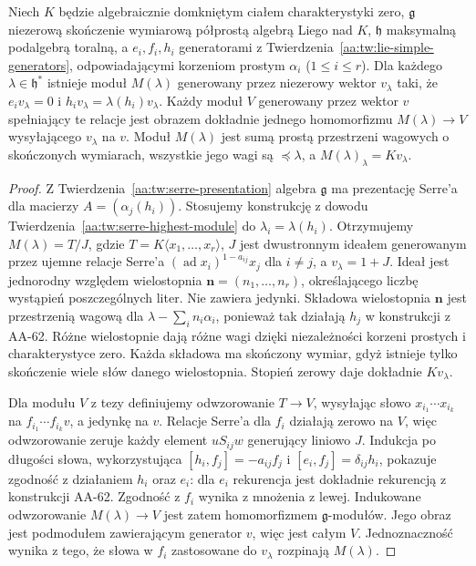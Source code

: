 \begin{twierdzenie}
\label{aa:tw:verma-universal}
Niech $K$ będzie algebraicznie domkniętym ciałem charakterystyki zero, $\mathfrak g$ niezerową skończenie wymiarową półprostą algebrą Liego nad $K$, $\mathfrak h$ maksymalną podalgebrą toralną, a $e_i,f_i,h_i$ generatorami z Twierdzenia~\ref{aa:tw:lie-simple-generators}, odpowiadającymi korzeniom prostym $\alpha_i$ ($1\le i\le r$). Dla każdego $\lambda\in\mathfrak h^*$ istnieje moduł $M(\lambda)$ generowany przez niezerowy wektor $v_\lambda$ taki, że $e_i v_\lambda=0$ i $h_i v_\lambda=\lambda(h_i)v_\lambda$. Każdy moduł $V$ generowany przez wektor $v$ spełniający te relacje jest obrazem dokładnie jednego homomorfizmu $M(\lambda)\to V$ wysyłającego $v_\lambda$ na $v$. Moduł $M(\lambda)$ jest sumą prostą przestrzeni wagowych o skończonych wymiarach, wszystkie jego wagi są $\preceq\lambda$, a $M(\lambda)_\lambda=Kv_\lambda$.
\end{twierdzenie}
\begin{proof}
Z Twierdzenia~\ref{aa:tw:serre-presentation} algebra $\mathfrak g$ ma prezentację Serre'a dla macierzy $A=(\alpha_j(h_i))$. Stosujemy konstrukcję z dowodu Twierdzenia~\ref{aa:tw:serre-highest-module} do $\lambda_i=\lambda(h_i)$. Otrzymujemy $M(\lambda)=T/J$, gdzie $T=K\langle x_1,\ldots,x_r\rangle$, $J$ jest dwustronnym ideałem generowanym przez ujemne relacje Serre'a $(\operatorname{ad}x_i)^{1-a_{ij}}x_j$ dla $i\ne j$, a $v_\lambda=1+J$. Ideał jest jednorodny względem wielostopnia $\mathbf n=(n_1,\ldots,n_r)$, określającego liczbę wystąpień poszczególnych liter. Nie zawiera jedynki. Składowa wielostopnia $\mathbf n$ jest przestrzenią wagową dla $\lambda-\sum_i n_i\alpha_i$, ponieważ tak działają $h_j$ w konstrukcji z AA-62. Różne wielostopnie dają różne wagi dzięki niezależności korzeni prostych i charakterystyce zero. Każda składowa ma skończony wymiar, gdyż istnieje tylko skończenie wiele słów danego wielostopnia. Stopień zerowy daje dokładnie $Kv_\lambda$.

Dla modułu $V$ z tezy definiujemy odwzorowanie $T\to V$, wysyłając słowo $x_{i_1}\cdots x_{i_k}$ na $f_{i_1}\cdots f_{i_k}v$, a jedynkę na $v$. Relacje Serre'a dla $f_i$ działają zerowo na $V$, więc odwzorowanie zeruje każdy element $uS_{ij}w$ generujący liniowo $J$. Indukcja po długości słowa, wykorzystująca $[h_i,f_j]=-a_{ij}f_j$ i $[e_i,f_j]=\delta_{ij}h_i$, pokazuje zgodność z działaniem $h_i$ oraz $e_i$: dla $e_i$ rekurencja jest dokładnie rekurencją z konstrukcji AA-62. Zgodność z $f_i$ wynika z mnożenia z lewej. Indukowane odwzorowanie $M(\lambda)\to V$ jest zatem homomorfizmem $\mathfrak g$-modułów. Jego obraz jest podmodułem zawierającym generator $v$, więc jest całym $V$. Jednoznaczność wynika z tego, że słowa w $f_i$ zastosowane do $v_\lambda$ rozpinają $M(\lambda)$.
\end{proof}

